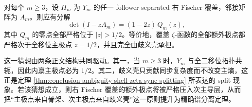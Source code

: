 \begin{conjecture}\label{conj:conclusion-fischer-cover-top-pole-ambiguity-shell-separation}
对每个 \(m\ge 3\)，设 \(H_m\) 为 \(Y_m\) 的任一 follower-separated 右 Fischer 覆盖，邻接矩阵为 \(A_m\)。则应有分解
\[
\det(I-zA_m)=(1-2z)\,Q_m(z),
\]
其中 \(Q_m\) 的零点全部严格位于 \(|z|>1/2\)。等价地，覆盖 \(\zeta\)-函数的全部额外极点都严格次于全移位主极点 \(z=1/2\)，并且完全由歧义壳承担。
\end{conjecture}

\noindent
这一猜想由两条正文结构共同驱动。其一，当 \(m\ge 3\) 时，\(Y_m\) 与全二移位拓扑共轭，因此内禀主极点必为 \(1/2\)。其二，歧义壳只贡献同步复杂度而不改变主熵，这正是定理 \ref{thm:conclusion-ambiguity-shell-zeta-sync-splitting} 所表达的 split 现象。若该猜想成立，则右 Fischer 覆盖的额外极点将被严格压入次主导层，从而把“主极点来自骨架、次主极点来自歧义壳”这一原则提升为精确谱分离定理。

